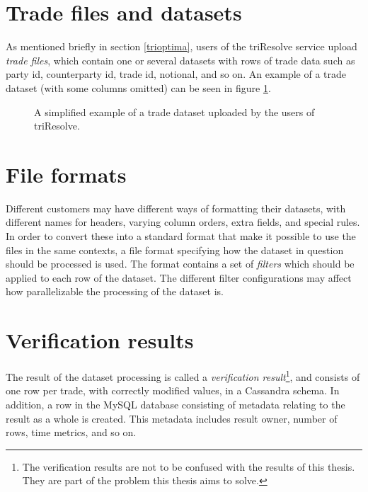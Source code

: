 \section{Trade files and datasets}
As mentioned briefly in section \ref{trioptima}, users of the triResolve service upload \textit{trade files}, which contain one or several datasets with
rows of trade data such as party id, counterparty id, trade id, notional, and so on. An example of a trade dataset (with some columns omitted) can be seen in figure
\ref{fig:data_set_example}.

\begin{figure}[ht]
\centering
{}
\caption[Example of trade dataset]{A simplified example of a trade dataset uploaded by the users of triResolve.}
  \label{fig:data_set_example}
\end{figure}

\section{File formats}
Different customers may have different ways of formatting their datasets, with different names for headers, varying column orders, extra fields,
and special rules. In order to convert these into a standard format that make it possible to use the files in the same contexts, a file format specifying
how the dataset in question should be processed is used. The format contains a set of \textit{filters} which should be applied to each row of the dataset.
The different filter configurations may affect how parallelizable the processing of the dataset is.

\section{Verification results}
The result of the dataset processing is called a \textit{verification result}\footnote{The verification results are not to be confused with the results of this thesis. They are part of the problem this thesis aims to solve.}, and consists of one row per trade, with correctly modified values, in a Cassandra schema.
In addition, a row in the MySQL database consisting of metadata relating to the result as a whole is created. This metadata includes result owner, number of rows, time metrics, and so on.


